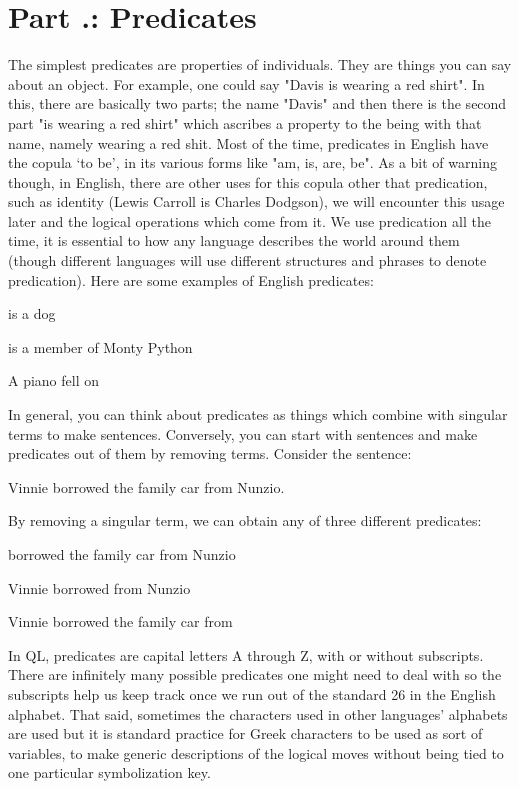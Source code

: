 \section{Part \thechapcount.\theseccount: Predicates}
The simplest \glspl{predicate} are properties of individuals. They are things you can say about an object. For example, one could say "Davis is wearing a red shirt". In this, there are basically two parts; the name "Davis" and then there is the second part "is wearing a red shirt" which ascribes a property to the being with that name, namely wearing a red shit. Most of the time, predicates in English have the copula ‘to be', in its various forms like "am, is, are, be". As a bit of warning though, in English, there are other uses for this copula other that predication, such as identity (Lewis Carroll is Charles Dodgson), we will encounter this usage later and the logical operations which come from it. We use predication all the time, it is essential to how any language describes the world around them (though different languages will use different structures and phrases to denote predication). Here are some examples of English predicates:
\begin{earg}
\item[]\blank is a dog
\item[]\blank  is a member of Monty Python
\item[]A piano fell on \blank 
\end{earg}
In general, you can think about predicates as things which combine with singular terms to make sentences. Conversely, you can start with sentences and make predicates out of them by removing terms. Consider the sentence:
\begin{center}
Vinnie borrowed the family car from Nunzio.
\end{center}
By removing a singular term, we can obtain any of three different predicates:
\begin{earg}
\item[] \blank  borrowed the family car from Nunzio
\item[] Vinnie borrowed \blank  from Nunzio
\item[] Vinnie borrowed the family car from \blank 
\end{earg}
In QL, predicates are capital letters A through Z, with or without subscripts. There are infinitely many possible predicates one might need to deal with so the subscripts help us keep track once we run out of the standard 26 in the English alphabet. That said, sometimes the characters used in other languages' alphabets are used but it is standard practice for Greek characters to be used as sort of variables, to make generic descriptions of the logical moves without being tied to one particular symbolization key.

